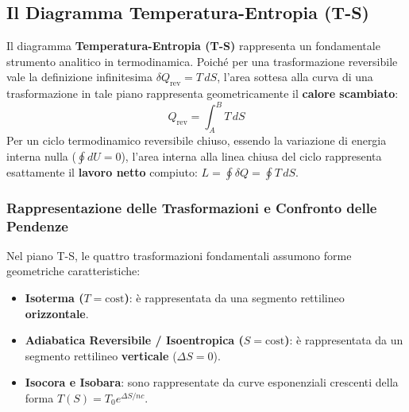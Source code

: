 \subsection{Il Diagramma Temperatura-Entropia (T-S)}
Il diagramma \textbf{Temperatura-Entropia (T-S)} rappresenta un fondamentale strumento analitico in termodinamica. Poiché per una trasformazione reversibile vale la definizione infinitesima $\delta Q_{\text{rev}} = T\,dS$, l'area sottesa alla curva di una trasformazione in tale piano rappresenta geometricamente il \textbf{calore scambiato}:
\begin{equation}
    \boxed{ Q_{\text{rev}} = \int_A^B T\,dS }
\end{equation}
Per un ciclo termodinamico reversibile chiuso, essendo la variazione di energia interna nulla ($\oint dU = 0$), l'area interna alla linea chiusa del ciclo rappresenta esattamente il \textbf{lavoro netto} compiuto: $L = \oint \delta Q = \oint T\,dS$.

\subsubsection{Rappresentazione delle Trasformazioni e Confronto delle Pendenze}
Nel piano T-S, le quattro trasformazioni fondamentali assumono forme geometriche caratteristiche:
\begin{itemize}
    \item \textbf{Isoterma ($T = \text{cost}$)}: è rappresentata da una segmento rettilineo \textbf{orizzontale}.
    \item \textbf{Adiabatica Reversibile / Isoentropica ($S = \text{cost}$)}: è rappresentata da un segmento rettilineo \textbf{verticale} ($\Delta S = 0$).
    \item \textbf{Isocora e Isobara}: sono rappresentate da curve esponenziali crescenti della forma $T(S) = T_0 e^{\Delta S / n c}$.
\end{itemize}

